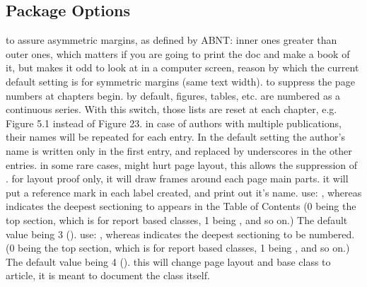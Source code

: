 \documentclass[dctools,english]{ufrgscca} %
\begin{document}
\subsection{Package Options}
\begin{Options}
	 to assure asymmetric margins, as defined by ABNT: inner ones greater than outer ones, which matters if you are going to print the doc and make a book of it, but makes it odd to look at in a computer screen, reason by which the current default setting is for symmetric margins (same text width).
	 to suppress the page numbers at chapters begin.
	 by default, figures, tables, etc. are numbered as a continuous series. With this switch, those lists are reset at each chapter, e.g. Figure 5.1 instead of Figure 23.
	 in case of authors with multiple publications, their names will be repeated for each entry. In the default setting the author's name is written only in the first entry, and replaced by underscores in the other entries.
	 in some rare cases,  might hurt page layout, this allows the suppression of .
	 for layout proof only, it will draw frames around each page main parts.
	 it will put a reference mark in each label created, and print out it's name.
	 use: , whereas  indicates the deepest sectioning to appears in the Table of Contents (0 being the top section, which is \Macro{\chapter}{} for report based classes, 1 being \Macro{\section}{}, and so on.) The default value being 3 (\Macro{\subsubsection}{}).
	 use: , whereas  indicates the deepest sectioning to be numbered. (0 being the top section, which is \Macro{\chapter}{} for report based classes, 1 being \Macro{\section}{}, and so on.) The default value being 4 (\Macro{\paragraph}{}).
	  this will change page layout and base class to article, it is meant to document the class itself.
\end{Options}
\end{document}
